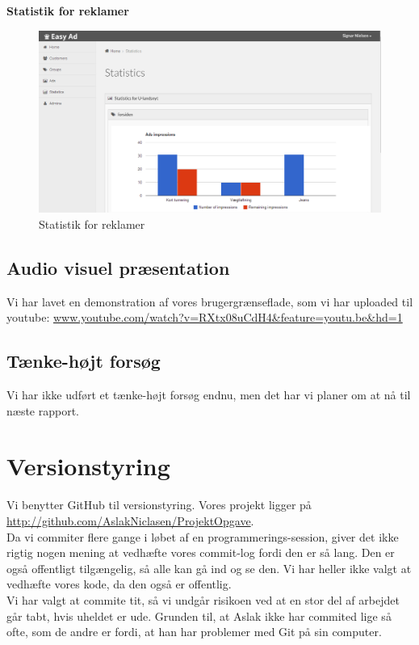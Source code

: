 \documentclass[a4paper,12pt]{article}
\begin{document}
\textbf{Statistik for reklamer}
\begin{figure}[h!]
  \centering
    \includegraphics[width=\textwidth]{statistics.png}
  \caption{Statistik for reklamer}
\end{figure}

\newpage
\subsection*{Audio visuel præsentation}
Vi har lavet en demonstration af vores brugergrænseflade, som vi har uploaded til youtube:
\newline
\url{www.youtube.com/watch?v=RXtx08uCdH4&feature=youtu.be&hd=1}

\subsection*{Tænke-højt forsøg}
Vi har ikke udført et tænke-højt forsøg endnu, men det har vi planer om at nå til næste rapport.

\section{Versionstyring}
Vi benytter GitHub til versionstyring. Vores projekt ligger på
\newline
\url{http://github.com/AslakNiclasen/ProjektOpgave}.
\newline
\\
Da vi commiter flere gange i løbet af en programmerings-session, giver det ikke rigtig nogen mening at vedhæfte vores commit-log fordi den er så lang. Den er også offentligt tilgængelig, så alle kan gå ind og se den. Vi har heller ikke valgt at vedhæfte vores kode, da den også er offentlig.
\newline
\\
Vi har valgt at commite tit, så vi undgår risikoen ved at en stor del af arbejdet går tabt, hvis uheldet er ude. Grunden til, at Aslak ikke har commited lige så ofte, som de andre er fordi, at han har problemer med Git på sin computer.
\end{document}
